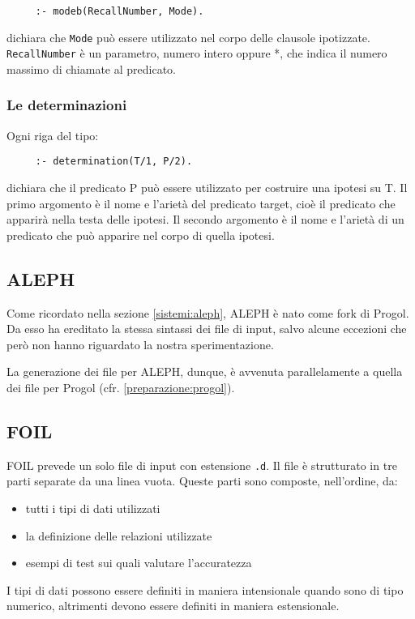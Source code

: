 \begin{verbatim}
     :- modeb(RecallNumber, Mode).
\end{verbatim}
dichiara che \verb+Mode+ può essere utilizzato nel corpo delle clausole ipotizzate. \verb+RecallNumber+ è un parametro, numero intero oppure *, che indica il numero massimo di chiamate al predicato.

\subsubsection*{Le determinazioni}
Ogni riga del tipo:
\begin{verbatim}
     :- determination(T/1, P/2).
\end{verbatim}
dichiara che il predicato P può essere utilizzato per costruire una ipotesi su T.
Il primo argomento è il nome e l'arietà del predicato target, cioè il predicato che apparirà nella testa delle ipotesi. Il secondo argomento è il nome e l'arietà di un predicato che può apparire nel corpo di quella ipotesi.

\subsection{ALEPH}
Come ricordato nella sezione \ref{sistemi:aleph}, ALEPH è nato come fork di Progol. Da esso ha ereditato la stessa sintassi dei file di input, salvo alcune eccezioni che però non hanno riguardato la nostra sperimentazione.

La generazione dei file per ALEPH, dunque, è avvenuta parallelamente a quella dei file per Progol (cfr. \ref{preparazione:progol}).


\subsection{FOIL}
FOIL prevede un solo file di input con estensione \verb+.d+.
Il file è strutturato in tre
parti separate da una linea vuota. Queste parti sono composte, nell'ordine, da:
\begin{itemize}
\item tutti i tipi di dati utilizzati
\item la definizione delle relazioni utilizzate
\item esempi di test sui quali valutare l'accuratezza
\end{itemize}

I tipi di dati possono essere definiti in maniera
intensionale quando sono di tipo numerico, altrimenti devono essere definiti in maniera estensionale. 
